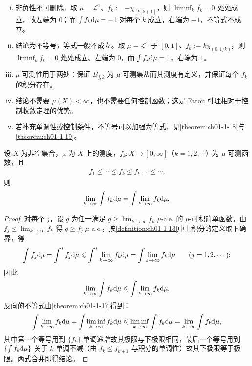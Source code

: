 \documentclass[../../main.tex]{subfiles}%
\begin{document}
\begin{remark}\label{remark:ch01-thm-1-17-条件}
\begin{enumerate}[(i)]
\item 非负性不可删除。取 $\mu=\mathcal{L}^1$、$f_k:=-\chi_{[k,k+1]}$，则 $\liminf_{k}f_k=0$ 处处成立，故左端为 $0$；而 $\int f_k\mathrm{d}\mu=-1$ 对每个 $k$ 成立，右端为 $-1$，不等式不成立。
\item 结论为不等号，等式一般不成立。取 $\mu=\mathcal{L}^1$ 于 $[0,1]$、$f_k:=k\chi_{(0,1/k)}$，则 $\liminf_{k}f_k=0$ 处处成立、左端为 $0$，而 $\int f_k\mathrm{d}\mu=1$，右端为 $1$。
\item $\mu$-可测性用于两处：保证 $B_{j,k}$ 为 $\mu$-可测集从而其测度有定义，并保证每个 $f_k$ 的积分存在。
\item 结论不需要 $\mu(X)<\infty$，也不需要任何控制函数；这是 Fatou 引理相对于控制收敛定理的优势。
\item 若补充单调性或控制条件，不等号可以加强为等式，见\cref{theorem:ch01-1-18}与\cref{theorem:ch01-1-19}。%
\end{enumerate}
\end{remark}

\begin{theorem}[单调收敛定理]\label{theorem:ch01-1-18}
设 $X$ 为非空集合，$\mu$ 为 $X$ 上的测度，$f_k:X\to[0,\infty]$（$k=1,2,\cdots$）为 $\mu$-可测函数，且
\begin{align*}
f_1\leqslant\cdots\leqslant f_k\leqslant f_{k+1}\leqslant\cdots .
\end{align*}
则
\begin{align}
\lim_{k\to\infty}\int f_k\mathrm{d}\mu=\int\lim_{k\to\infty}f_k\mathrm{d}\mu .\label{align:ch01-1-18-mct}
\end{align}
\end{theorem}

\begin{proof}
对每个 $j$，设 $g$ 为任一满足 $g\geqslant\lim_{k\to\infty}f_k$ $\mu$-a.e. 的 $\mu$-可积简单函数。由 $f_j\leqslant\lim_{k\to\infty}f_k$ 得 $g\geqslant f_j$ $\mu$-a.e.，按\cref{definition:ch01-1-13}中上积分的定义取下确界，得%
\begin{align*}
\int f_j\mathrm{d}\mu=\int^{*}f_j\mathrm{d}\mu\leqslant\int^{*}\lim_{k\to\infty}f_k\mathrm{d}\mu=\int\lim_{k\to\infty}f_k\mathrm{d}\mu\qquad(j=1,2,\cdots);
\end{align*}
因此
\begin{align*}
\lim_{k\to\infty}\int f_k\mathrm{d}\mu\leqslant\int\lim_{k\to\infty}f_k\mathrm{d}\mu .
\end{align*}
反向的不等式由\cref{theorem:ch01-1-17}得到：%
\begin{align*}
\int\lim_{k\to\infty}f_k\mathrm{d}\mu=\int\liminf_{k\to\infty}f_k\mathrm{d}\mu\leqslant\liminf_{k\to\infty}\int f_k\mathrm{d}\mu=\lim_{k\to\infty}\int f_k\mathrm{d}\mu,
\end{align*}
其中第一个等号用到 $\{f_k\}$ 单调递增故其极限与下极限相同，最后一个等号用到 $\{\int f_k\mathrm{d}\mu\}$ 关于 $k$ 单调不减（由 $f_k\leqslant f_{k+1}$ 与积分的单调性）故其下极限等于极限。两式合并即得结论。
\end{proof}
\end{document}
